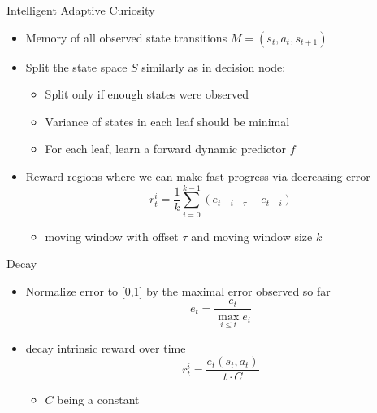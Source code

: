 \begin{frame}[c]{Intelligent Adaptive Curiosity~}
	
	\begin{itemize}
		\item Memory of all observed state transitions $M = (s_t, a_t, s_{t+1})$
		\item Split the state space $S$ similarly as in decision node:
		\begin{itemize}
			\item Split only if enough states were observed
			\item Variance of states in each leaf should be minimal
			\item For each leaf, learn a forward dynamic predictor $f$
		\end{itemize}
		\item Reward regions where we can make fast progress via decreasing error
		$$r_t^i = \frac{1}{k} \sum_{i=0}^{k-1} (e_{t-i-\tau} - e_{t-i})$$
		\begin{itemize}
			\item moving window with offset $\tau$ and moving window size $k$
		\end{itemize}
		
	\end{itemize}
	
	
\end{frame}
\begin{frame}[c]{Decay~}
	
	\begin{itemize}
		\item Normalize error to [0,1] by the maximal error observed so far
		$$\bar{e}_t = \frac{e_t}{\max_{i \leq t} e_i} $$
		\item decay intrinsic reward over time
		$$r_t^i = \frac{e_t(s_t, a_t)}{t \cdot C}$$ 
		\begin{itemize}
			\item $C$ being a constant
		\end{itemize}
	\end{itemize}

	
\end{frame}

